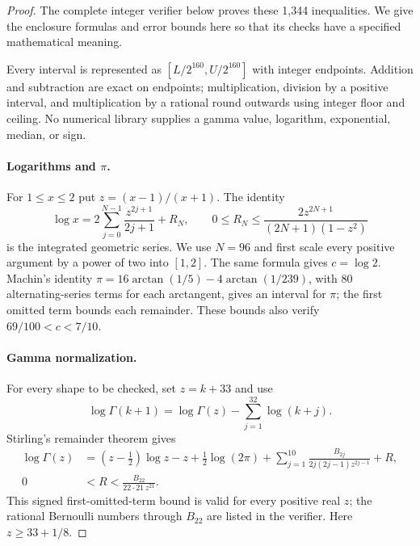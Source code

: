 \documentclass[11pt,a4paper]{article}
\numberwithin{equation}{section}
\theoremstyle{definition}
\theoremstyle{remark}
\begin{document}
\begin{proof}
The complete integer verifier below proves these 1,344 inequalities.
We give the enclosure formulas and error bounds here so that its checks
have a specified mathematical meaning.

Every interval is represented as $[L/2^{160},U/2^{160}]$ with integer
endpoints. Addition and subtraction are exact on endpoints; multiplication,
division by a positive interval, and multiplication by a rational round
outwards using integer floor and ceiling. No numerical library supplies a
gamma value, logarithm, exponential, median, or sign.

\paragraph{Logarithms and $\pi$.}
For $1\le x\le2$ put $z=(x-1)/(x+1)$. The identity
\[
 \log x=2\sum_{j=0}^{N-1}\frac{z^{2j+1}}{2j+1}+R_N,
 \qquad
 0\le R_N\le\frac{2z^{2N+1}}{(2N+1)(1-z^2)}
\]
is the integrated geometric series. We use $N=96$ and first scale every
positive argument by a power of two into $[1,2]$. The same formula gives
$c=\log2$. Machin's identity
$\pi=16\arctan(1/5)-4\arctan(1/239)$, with 80 alternating-series terms
for each arctangent, gives an interval for $\pi$; the first omitted term
bounds each remainder. These bounds also verify $69/100<c<7/10$.

\paragraph{Gamma normalization.}
For every shape to be checked, set $z=k+33$ and use
\[
 \log\Gamma(k+1)=\log\Gamma(z)-\sum_{j=1}^{32}\log(k+j).
\]
Stirling's remainder theorem \cite[\S5.11(ii)]{add47heisei:dlmf} gives
\begin{align*}
 \log\Gamma(z)
 &=\left(z-\tfrac12\right)\log z-z+\tfrac12\log(2\pi)
   +\sum_{j=1}^{10}\frac{B_{2j}}{2j(2j-1)z^{2j-1}}+R,\\
 0&<R<\frac{B_{22}}{22\cdot21\,z^{21}}.
\end{align*}
This signed first-omitted-term bound is valid for every positive real
$z$; the rational Bernoulli numbers through $B_{22}$ are listed in the
verifier. Here $z\ge33+1/8$.


\end{proof}
\end{document}
